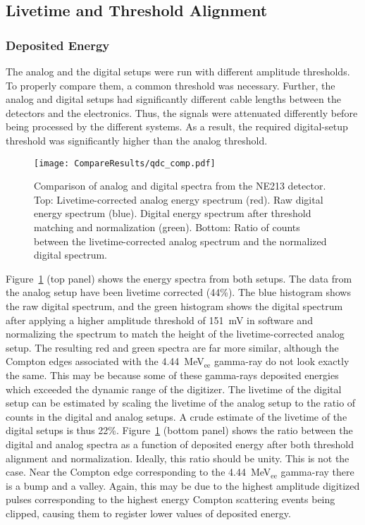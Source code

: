 \documentclass[main.tex]{subfiles}
\begin{document}
\subsection{Livetime and Threshold Alignment}
\subsubsection{Deposited Energy}
The analog and the digital setups were run with different amplitude thresholds. To properly compare them, a common threshold was necessary. Further, the analog and digital setups had significantly different cable lengths between the detectors and the electronics. Thus, the signals were attenuated differently before being processed by the different systems. As a result, the required digital-setup threshold was significantly higher than the analog threshold.

\begin{figure}[h!]
    \centering
        \texttt{[image: CompareResults/qdc\_comp.pdf]}
        \caption[Comparison of analog and digital spectra from the NE213 detector.]{Comparison of analog and digital spectra from the NE213 detector. Top: Livetime-corrected analog energy spectrum (red). Raw digital energy spectrum (blue). Digital energy spectrum after threshold matching and normalization (green). Bottom: Ratio of counts between the livetime-corrected analog spectrum and the normalized digital spectrum.}
    \label{fig:qdc_comp}
\end{figure}
Figure~\ref{fig:qdc_comp} (top panel) shows the energy spectra from both setups. The data from the analog setup have been livetime corrected (44\%). The blue histogram shows the raw digital spectrum, and the green histogram shows the digital spectrum after applying a higher amplitude threshold of \SI{151}{mV} in software and normalizing the spectrum to match the height of the livetime-corrected analog setup. The resulting red and green spectra are far more similar, although the Compton edges associated with the \SI{4.44}{\MeV}$_\textrm{ee}$ gamma-ray do not look exactly the same. This may be because some of these gamma-rays deposited energies which exceeded the dynamic range of the digitizer. 
The livetime of the digital setup can be estimated by scaling the livetime of the analog setup to the ratio of counts in the digital and analog setups. A crude estimate of the livetime of the digital setups is thus 22\%.
Figure~\ref{fig:qdc_comp} (bottom panel) shows the ratio between the digital and analog spectra as a function of deposited energy after both threshold alignment and normalization. Ideally, this ratio should be unity. This is not the case. Near the Compton edge corresponding to the \SI{4.44}{\MeV}$_\textrm{ee}$ gamma-ray there is a bump and a valley. Again, this may be due to the highest amplitude digitized pulses corresponding to the highest energy Compton scattering events being clipped, causing them to register lower values of deposited energy.
\end{document}
